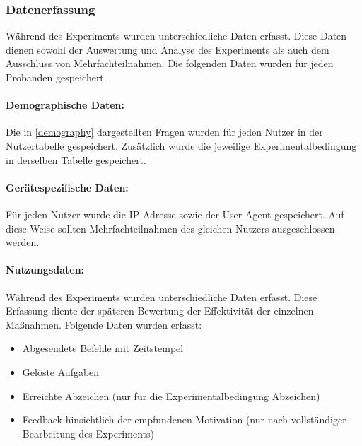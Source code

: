 \subsubsection{Datenerfassung}
Während des Experiments wurden unterschiedliche Daten erfasst. Diese Daten dienen sowohl der Auswertung und Analyse des Experiments als auch dem Ausschluss von Mehrfachteilnahmen. Die folgenden Daten wurden für jeden Probanden gespeichert.

\paragraph{Demographische Daten:}
Die in \ref{demography} dargestellten Fragen wurden für jeden Nutzer in der Nutzertabelle gespeichert. Zusätzlich wurde die jeweilige Experimentalbedingung in derselben Tabelle gespeichert.

\paragraph{Gerätespezifische Daten:}
Für jeden Nutzer wurde die IP-Adresse sowie der User-Agent gespeichert. Auf diese Weise sollten Mehrfachteilnahmen des gleichen Nutzers ausgeschlossen werden.

\paragraph{Nutzungsdaten:}
Während des Experiments wurden unterschiedliche Daten erfasst. Diese Erfassung diente der späteren Bewertung der Effektivität der einzelnen Maßnahmen. Folgende Daten wurden erfasst:

\begin{itemize}
	 \item Abgesendete Befehle mit Zeitstempel
	 \item Gelöste Aufgaben 
	 \item Erreichte Abzeichen (nur für die Experimentalbedingung Abzeichen)
	 \item Feedback hinsichtlich der empfundenen Motivation (nur nach vollständiger Bearbeitung des Experiments)
\end{itemize}


